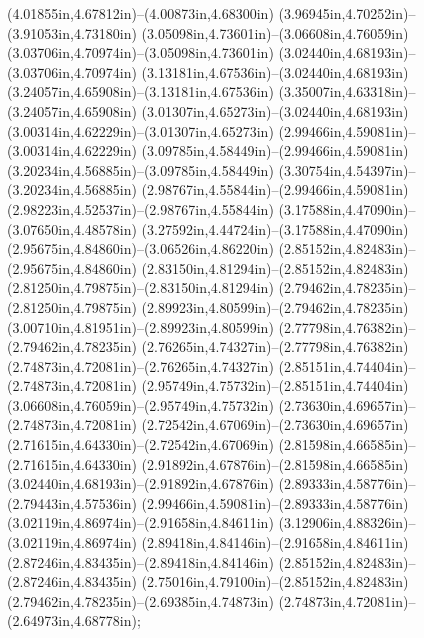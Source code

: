 (4.01855in,4.67812in)--(4.00873in,4.68300in) (3.96945in,4.70252in)--(3.91053in,4.73180in) (3.05098in,4.73601in)--(3.06608in,4.76059in) (3.03706in,4.70974in)--(3.05098in,4.73601in) (3.02440in,4.68193in)--(3.03706in,4.70974in) (3.13181in,4.67536in)--(3.02440in,4.68193in) (3.24057in,4.65908in)--(3.13181in,4.67536in) (3.35007in,4.63318in)--(3.24057in,4.65908in) (3.01307in,4.65273in)--(3.02440in,4.68193in) (3.00314in,4.62229in)--(3.01307in,4.65273in) (2.99466in,4.59081in)--(3.00314in,4.62229in) (3.09785in,4.58449in)--(2.99466in,4.59081in) (3.20234in,4.56885in)--(3.09785in,4.58449in) (3.30754in,4.54397in)--(3.20234in,4.56885in) (2.98767in,4.55844in)--(2.99466in,4.59081in) (2.98223in,4.52537in)--(2.98767in,4.55844in) (3.17588in,4.47090in)--(3.07650in,4.48578in) (3.27592in,4.44724in)--(3.17588in,4.47090in) (2.95675in,4.84860in)--(3.06526in,4.86220in) (2.85152in,4.82483in)--(2.95675in,4.84860in) (2.83150in,4.81294in)--(2.85152in,4.82483in) (2.81250in,4.79875in)--(2.83150in,4.81294in) (2.79462in,4.78235in)--(2.81250in,4.79875in) (2.89923in,4.80599in)--(2.79462in,4.78235in) (3.00710in,4.81951in)--(2.89923in,4.80599in) (2.77798in,4.76382in)--(2.79462in,4.78235in) (2.76265in,4.74327in)--(2.77798in,4.76382in) (2.74873in,4.72081in)--(2.76265in,4.74327in) (2.85151in,4.74404in)--(2.74873in,4.72081in) (2.95749in,4.75732in)--(2.85151in,4.74404in) (3.06608in,4.76059in)--(2.95749in,4.75732in) (2.73630in,4.69657in)--(2.74873in,4.72081in) (2.72542in,4.67069in)--(2.73630in,4.69657in) (2.71615in,4.64330in)--(2.72542in,4.67069in) (2.81598in,4.66585in)--(2.71615in,4.64330in) (2.91892in,4.67876in)--(2.81598in,4.66585in) (3.02440in,4.68193in)--(2.91892in,4.67876in) (2.89333in,4.58776in)--(2.79443in,4.57536in) (2.99466in,4.59081in)--(2.89333in,4.58776in) (3.02119in,4.86974in)--(2.91658in,4.84611in) (3.12906in,4.88326in)--(3.02119in,4.86974in) (2.89418in,4.84146in)--(2.91658in,4.84611in) (2.87246in,4.83435in)--(2.89418in,4.84146in) (2.85152in,4.82483in)--(2.87246in,4.83435in) (2.75016in,4.79100in)--(2.85152in,4.82483in) (2.79462in,4.78235in)--(2.69385in,4.74873in) (2.74873in,4.72081in)--(2.64973in,4.68778in);
